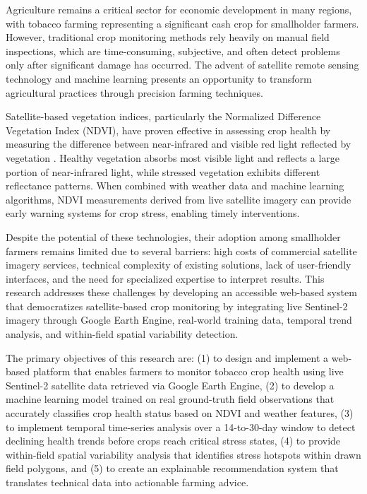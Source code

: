 \documentclass[journal]{IEEEtran}
\begin{document}
Agriculture remains a critical sector for economic development in many regions, with tobacco farming representing a significant cash crop for smallholder farmers. However, traditional crop monitoring methods rely heavily on manual field inspections, which are time-consuming, subjective, and often detect problems only after significant damage has occurred. The advent of satellite remote sensing technology and machine learning presents an opportunity to transform agricultural practices through precision farming techniques.

Satellite-based vegetation indices, particularly the Normalized Difference Vegetation Index (NDVI), have proven effective in assessing crop health by measuring the difference between near-infrared and visible red light reflected by vegetation \cite{rouse1974monitoring}. Healthy vegetation absorbs most visible light and reflects a large portion of near-infrared light, while stressed vegetation exhibits different reflectance patterns. When combined with weather data and machine learning algorithms, NDVI measurements derived from live satellite imagery can provide early warning systems for crop stress, enabling timely interventions.

Despite the potential of these technologies, their adoption among smallholder farmers remains limited due to several barriers: high costs of commercial satellite imagery services, technical complexity of existing solutions, lack of user-friendly interfaces, and the need for specialized expertise to interpret results. This research addresses these challenges by developing an accessible web-based system that democratizes satellite-based crop monitoring by integrating live Sentinel-2 imagery through Google Earth Engine, real-world training data, temporal trend analysis, and within-field spatial variability detection.

The primary objectives of this research are: (1) to design and implement a web-based platform that enables farmers to monitor tobacco crop health using live Sentinel-2 satellite data retrieved via Google Earth Engine, (2) to develop a machine learning model trained on real ground-truth field observations that accurately classifies crop health status based on NDVI and weather features, (3) to implement temporal time-series analysis over a 14-to-30-day window to detect declining health trends before crops reach critical stress states, (4) to provide within-field spatial variability analysis that identifies stress hotspots within drawn field polygons, and (5) to create an explainable recommendation system that translates technical data into actionable farming advice.
\end{document}
